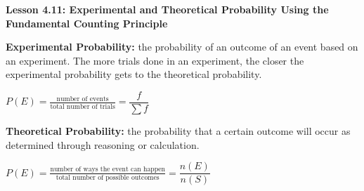  \begin{center}
\textbf{Lesson 4.11: Experimental and Theoretical Probability Using the Fundamental Counting Principle}
\end{center}

\vspace*{-1.5ex}


\textbf{Experimental Probability:} the probability of an outcome of an event based on an experiment. The more trials done in an experiment, the closer the experimental probability gets to the theoretical probability.

{\centering $ P(E) = \displaystyle \frac{\text{number of events}}{\text{total number of trials}} = \dfrac{f}{\sum f} $\par}

\textbf{Theoretical Probability:} the probability that a certain outcome will occur as determined through reasoning or calculation.

{\centering $ P(E) = \displaystyle \frac{\text{number of ways the event can happen}}{\text{total number of possible outcomes}} = \dfrac{n(E)}{n(S)} $\par}
